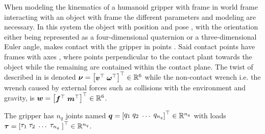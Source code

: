 When modeling the kinematics of a humanoid gripper with frame  in world frame  interacting with an object with frame  the different parameters and modeling are necessary. In this system the object with position  and pose , with the orientation either being represented as a four-dimensional quaternion or a three-dimensional Euler angle, makes contact with the gripper in points . Said contact points have frames  with axes , where  points perpendicular to the contact plant towards the object while the remaining are contained within the contact plane. The twist of  described in  is denoted $\vec{\nu} = \rvec{\vec{v}^\T \vsep \vec{\omega}^\T}^\T\inR{6} $ while the non-contact wrench i.e. the wrench caused by external forces such as collisions with the environment and gravity, is $\vec{w} = \rvec{\vec{f}^\T \vsep \vec{m}^\T}^\T\inR{6}$. \medskip

The gripper has $n_q$ joints named $\vec{q} = \rvec{q_1  \vsep q_2  \vsep \dots  \vsep q_{n_q}}^\T\in\R^{n_q}$ with loads $\vec{\tau} = \rvec{\tau_1  \vsep\tau_2  \vsep\dots  \vsep\tau_{n_q} \vsep}^\T\in\R^{n_q}$.







